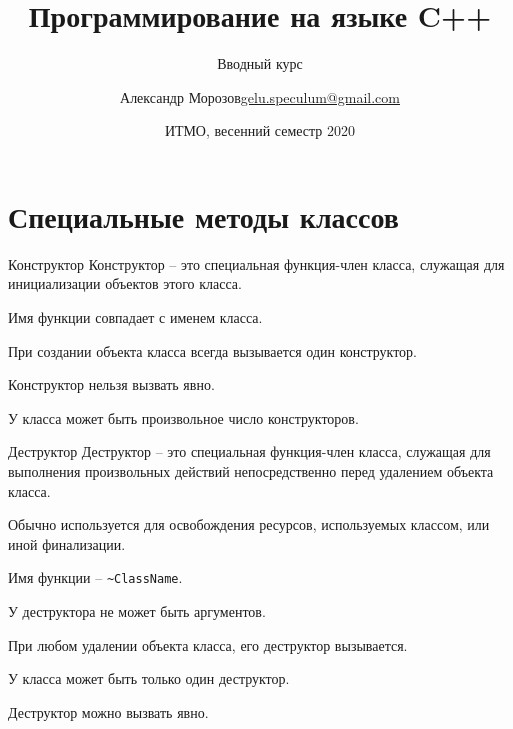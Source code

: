 \documentclass[unknownkeysallowed,xcolor=table]{beamer}
\title[C++]
{Программирование на языке C++}
\subtitle{Вводный курс}
\author[А.~Б.~Морозов]
{
  \texorpdfstring{Александр Морозов\newline\href{mailto:gelu.speculum@gmail.com}{gelu.speculum@gmail.com}}
  {Александр Морозов}
}
\date[ITMO 2020]
{ИТМО, весенний семестр 2020}
\begin{document}
\frame{\titlepage}


\section{Специальные методы классов}

\begin{frame}{Конструктор}
  Конструктор -- это специальная функция-член класса, служащая для инициализации объектов этого класса.

  \vspace{1em}

  Имя функции совпадает с именем класса.

  \vspace{1em}

  При создании объекта класса всегда вызывается один конструктор.

  \vspace{1em}

  Конструктор нельзя вызвать явно.

  \vspace{1em}

  У класса может быть произвольное число конструкторов.
\end{frame}

\begin{frame}[fragile]{Деструктор}
  Деструктор -- это специальная функция-член класса, служащая для выполнения произвольных действий непосредственно перед удалением объекта класса.

  \vspace{1em}

  Обычно используется для освобождения ресурсов, используемых классом, или иной финализации.

  \vspace{1em}

  Имя функции -- \lstinline{~ClassName}.

  \vspace{1em}

  У деструктора не может быть аргументов.

  \vspace{1em}

  При любом удалении объекта класса, его деструктор вызывается.

  \vspace{1em}

  У класса может быть только один деструктор.

  \vspace{1em}

  Деструктор можно вызвать явно.
\end{frame}
\end{document}
